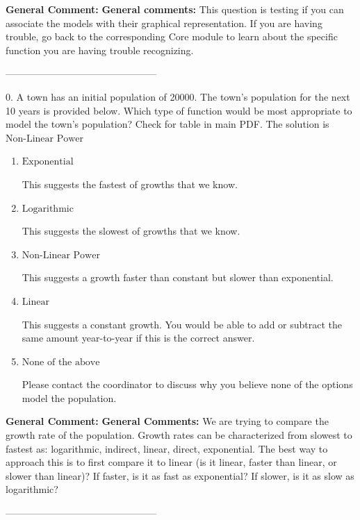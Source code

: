 \documentclass{extbook}[14pt]
\begin{document}
\textbf{General Comment:} \textbf{General comments:} This question is testing if you can associate the models with their graphical representation. If you are having trouble, go back to the corresponding Core module to learn about the specific function you are having trouble recognizing. 

-----------------------------------------------

0. A town has an initial population of 20000. The town's population for the next 10 years is provided below. Which type of function would be most appropriate to model the town's population?
Check for table in main PDF. 
The solution is $ \text{Non-Linear Power} $ 

\begin{enumerate}[label=\Alph*.] 
\item $ \text{Exponential} $ 

 This suggests the fastest of growths that we know. 
\item $ \text{Logarithmic} $ 

 This suggests the slowest of growths that we know. 
\item $ \text{Non-Linear Power} $ 

 This suggests a growth faster than constant but slower than exponential. 
\item $ \text{Linear} $ 

 This suggests a constant growth. You would be able to add or subtract the same amount year-to-year if this is the correct answer. 
\item $ \text{None of the above} $ 

 Please contact the coordinator to discuss why you believe none of the options model the population. 
\end{enumerate} 
 
\textbf{General Comment:} \textbf{General Comments:} We are trying to compare the growth rate of the population. Growth rates can be characterized from slowest to fastest as: logarithmic, indirect, linear, direct, exponential. The best way to approach this is to first compare it to linear (is it linear, faster than linear, or slower than linear)? If faster, is it as fast as exponential? If slower, is it as slow as logarithmic? 

-----------------------------------------------
\end{document}
